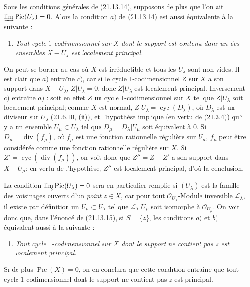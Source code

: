 \begin{remark}[21.13.16]
\label{IV.21.13.16}
Sous les conditions générales de (21.13.14), supposons de plus que l'on ait
$\varinjlim\operatorname{Pic}(U_\lambda)=0$. Alors la condition $a)$ de (21.13.14)
est aussi équivalente à la suivante :
\begin{enumerate}
  \item[c)] \emph{Tout cycle $1$-codimensionnel sur $X$ dont le support est contenu
  dans un des ensembles $X-U_\lambda$ est localement principal.}
\end{enumerate}

On peut se borner au cas où $X$ est irréductible et tous les $U_\lambda$ sont non
vides. Il est clair que $a)$ entraîne $c)$, car si le cycle $1$-codimensionnel $Z$ sur
$X$ a son support dans $X-U_\lambda$, $Z|U_\lambda=0$, donc $Z|U_\lambda$ est
localement principal. Inversement $c)$ entraîne $a)$ : soit en effet $Z$ un cycle
$1$-codimensionnel sur $X$ tel que $Z|U_\lambda$ soit localement principal; comme $X$
est normal, $Z|U_\lambda=\operatorname{cyc}(D_\lambda)$, où $D_\lambda$ est un
diviseur sur $U_\lambda$ (21.6.10, (ii)), et l'hypothèse implique (en vertu de
(21.3.4)) qu'il y a un ensemble $U_\mu\subset U_\lambda$ tel que
$D_\mu=D_\lambda|U_\mu$ soit équivalent à $0$. Si
$D_\mu=\operatorname{div}(f_\mu)$, où $f_\mu$ est une fonction rationnelle régulière
sur $U_\mu$, $f_\mu$ peut être considérée comme une fonction rationnelle régulière
sur $X$. Si $Z'=\operatorname{cyc}(\operatorname{div}(f_\mu))$, on voit donc que
$Z''=Z-Z'$ a son support dans $X-U_\mu$; en vertu de l'hypothèse, $Z''$ est
localement principal, d'où la conclusion.

La condition $\varinjlim\operatorname{Pic}(U_\lambda)=0$ sera en particulier remplie
si $(U_\lambda)$ est la famille des voisinages ouverts d'un \emph{point} $z\in X$,
car pour tout $\mathcal O_{U_\lambda}$-Module inversible $\mathscr L_\lambda$, il
existe par définition un $U_\mu\subset U_\lambda$ tel que
$\mathscr L_\lambda|U_\mu$ soit isomorphe à $\mathcal O_{U_\mu}$. On voit donc que,
dans l'énoncé de (21.13.15), si $S=\{z\}$, les conditions $a)$ et $b)$ équivalent
aussi à la suivante :
\begin{enumerate}
  \item[c)] \emph{Tout cycle $1$-codimensionnel sur $X$ dont le support ne contient
  pas $z$ est localement principal.}
\end{enumerate}
Si de plus $\operatorname{Pic}(X)=0$, on en conclura que cette condition entraîne que
tout cycle $1$-codimensionnel dont le support ne contient pas $z$ est principal.
\end{remark}

